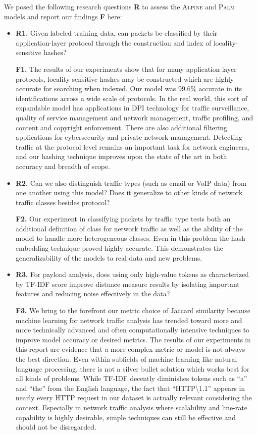 We posed the following research questions \textbf{R} to assess the \textsc{Alpine} and \textsc{Palm} models and report our findings \textbf{F} here:

\begin{itemize}
\item\textbf{R1.} Given labeled training data, can packets be classified by their application-layer protocol through the construction and index of locality-sensitive hashes?

\textbf{F1.} The results of our experiments show that for many application layer protocols, locality sensitive hashes may be constructed which are highly accurate for searching when indexed. Our model was 99.6\% accurate in its identifications across a wide scale of protocols. In the real world, this sort of expandable model has applications in DPI technology for traffic surveillance, quality of service management and network management, traffic profiling, and content and copyright enforcement. There are also additional filtering applications for cybersecurity and private network management. Detecting traffic at the protocol level remains an important task for network engineers, and our hashing technique improves upon the state of the art in both accuracy and breadth of scope.

\item\textbf{R2.} Can we also distinguish traffic types (such as email or VoIP data) from one another using this model? Does it generalize to other kinds of network traffic classes besides protocol?

\textbf{F2.} Our experiment in classifying packets by traffic type tests both an additional definition of class for network traffic as well as the ability of the model to handle more heterogeneous classes. Even in this problem the hash embedding technique proved highly accurate. This demonstrates the generalizability of the models to real data and new problems.

\item\textbf{R3.} For payload analysis, does using only high-value tokens as characterized by TF-IDF score improve distance measure results by isolating important features and reducing noise effectively in the data?

\textbf{F3.} We bring to the forefront our metric choice of Jaccard similarity because machine learning for network traffic analysis has trended toward more and more technically advanced and often computationally intensive techniques to improve model accuracy or desired metrics. The results of our experiments in this report are evidence that a more complex metric or model is not always the best direction. Even within subfields of machine learning like natural language processing, there is not a silver bullet solution which works best for all kinds of problems. While TF-IDF decently diminishes tokens such as ``a'' and ``the'' from the English language, the fact that ``\textsc{HTTP\textbackslash1.1}'' appears in nearly every HTTP request in our dataset is actually relevant considering the context. Especially in network traffic analysis where scalability and line-rate capability is highly desirable, simple techniques can still be effective and should not be disregarded.


\end{itemize}
